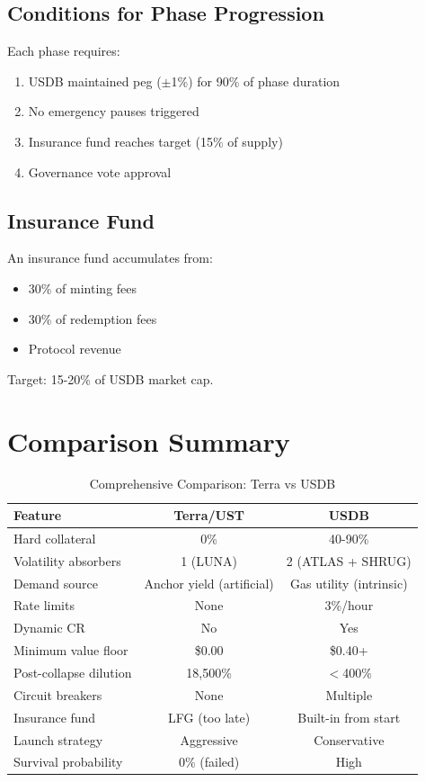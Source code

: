 \documentclass[11pt,a4paper]{article}
\begin{document}
\subsection{Conditions for Phase Progression}

Each phase requires:
\begin{enumerate}
    \item USDB maintained peg ($\pm$1\%) for 90\% of phase duration
    \item No emergency pauses triggered
    \item Insurance fund reaches target (15\% of supply)
    \item Governance vote approval
\end{enumerate}

\subsection{Insurance Fund}

An insurance fund accumulates from:
\begin{itemize}
    \item 30\% of minting fees
    \item 30\% of redemption fees
    \item Protocol revenue
\end{itemize}

Target: 15-20\% of USDB market cap.

\section{Comparison Summary}

\begin{table}[H]
\centering
\caption{Comprehensive Comparison: Terra vs USDB}
\begin{tabular}{@{}lcc@{}}
\toprule
\textbf{Feature} & \textbf{Terra/UST} & \textbf{USDB} \\ \midrule
Hard collateral & 0\% & 40-90\% \\
Volatility absorbers & 1 (LUNA) & 2 (ATLAS + SHRUG) \\
Demand source & Anchor yield (artificial) & Gas utility (intrinsic) \\
Rate limits & None & 3\%/hour \\
Dynamic CR & No & Yes \\
Minimum value floor & \$0.00 & \$0.40+ \\
Post-collapse dilution & 18,500\% & $<$400\% \\
Circuit breakers & None & Multiple \\
Insurance fund & LFG (too late) & Built-in from start \\
Launch strategy & Aggressive & Conservative \\
Survival probability & 0\% (failed) & High \\ \bottomrule
\end{tabular}
\end{table}
\end{document}
